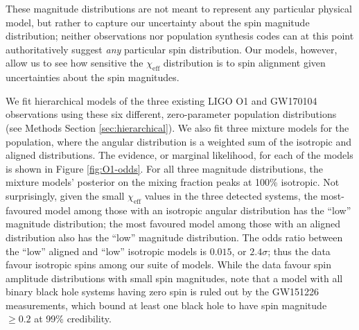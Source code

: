\documentclass{nature-arxiv}
\newcommand{\chieff}{\chi_\mathrm{eff}}
\newcommand{\OOneSigmaIsoAligned}{2.4}
\newcommand{\OOneOddsIsoAligned}{0.015}
\begin{document}
These magnitude distributions are not meant to represent any
particular physical model, but rather to capture our uncertainty about
the spin magnitude distribution; neither observations nor population
synthesis codes can at this point authoritatively suggest \emph{any}
particular spin distribution\cite{2015PhR...548....1M}.  Our models,
however, allow us to see how sensitive the $\chieff$ distribution is
to spin alignment given uncertainties about the spin magnitudes.

We fit hierarchical models of the three existing LIGO O1 and GW170104
observations using these six different, zero-parameter population
distributions (see Methods Section \ref{sec:hierarchical}).  We also
fit three mixture models for the population, where the angular
distribution is a weighted sum of the isotropic and aligned
distributions.  The evidence, or marginal likelihood, for each of the
models is shown in Figure \ref{fig:O1-odds}.  For all three magnitude
distributions, the mixture models' posterior on the mixing fraction
peaks at 100\% isotropic.  Not surprisingly, given the small $\chieff$
values in the three detected systems, the most-favoured model among
those with an isotropic angular distribution has the ``low'' magnitude
distribution; the most favoured model among those with an aligned
distribution also has the ``low'' magnitude distribution.  The odds
ratio between the ``low'' aligned and ``low'' isotropic models is
$\OOneOddsIsoAligned$, or $\OOneSigmaIsoAligned\sigma$; thus the data
favour isotropic spins among our suite of models.  While the data
favour spin amplitude distributions with small spin magnitudes, note
that a model with all binary black hole systems having zero spin is
ruled out by the GW151226 measurements, which bound at least one black
hole to have spin magnitude $\geq 0.2$ at 99\%
credibility\cite{2016PhRvL.116x1103A}.
\end{document}
